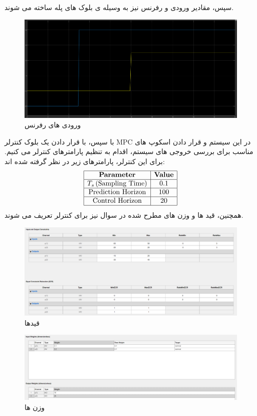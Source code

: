 سپس، مقادیر ورودی و رفرنس نیز به وسیله ی بلوک های پله ساخته می شوند.
\begin{figure}[H]
	\centering
	\includegraphics[width=1\linewidth]{../img/Q2_refernece}
	\caption{ورودی های رفرنس}
	\label{fig:q2refernece}
\end{figure}

با سپس، با قرار دادن یک بلوک کنترلر MPC در این سیستم و قرار دادن اسکوپ های مناسب برای بررسی خروجی های سیستم، اقدام به تنظیم پارامترهای کنترلر می کنیم. 
برای این کنترلر، پارامترهای زیر در نظر گرفته شده اند:
\[
\begin{array}{|c|c|}
	\hline
	\textbf{Parameter} & \textbf{Value} \\ 
	\hline
	T_s \, (\text{Sampling Time}) & 0.1 \\ 
	\hline
	\text{Prediction Horizon} & 100 \\ 
	\hline
	\text{Control Horizon} & 20 \\ 
	\hline
\end{array}
\]
همچنین، قید ها و وزن های مطرح شده در سوال نیز برای کنترلر تعریف می شوند.
\begin{figure}[H]
	\centering
	\includegraphics[width=1\linewidth]{../img/Q2_constraints}
	\caption{قیدها}
	\label{fig:q2constraints}
\end{figure}

\begin{figure}[H]
	\centering
	\includegraphics[width=1\linewidth]{../img/Q2_weights}
	\caption{وزن ها}
	\label{fig:q2weights}
\end{figure}

